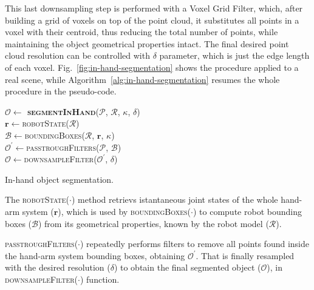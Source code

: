 This last downsampling step is performed with a Voxel Grid Filter, which, after
building a grid of voxels on top of the point cloud, it
substitutes all points in a voxel with their centroid, thus reducing the total number of 
points, while maintaining the object geometrical properties intact. The final desired
point cloud resolution can be controlled with $\delta$ parameter, which is just the edge length of each voxel.
Fig.~\ref{fig:in-hand-segmentation} shows the procedure applied to a real scene,
while  Algorithm~\ref{alg:in-hand-segmentation} resumes  the whole  procedure in
the pseudo-code.

\begin{algorithm}[h]
    \textbf{$\mathcal{O} \leftarrow$ \textsc{segmentInHand}}($\mathcal{P}$, $\mathcal{R}$, $\kappa$, $\delta$)\\ %
\LinesNumbered
\DontPrintSemicolon
\SetAlgoVlined {} 
  $\mathbf{r} \leftarrow$\textsc{robotState}($\mathcal{R}$) \\
  $\mathcal{B} \leftarrow$\textsc{boundingBoxes}($\mathcal{R}$, $\mathbf{r}$, $\kappa$) \\
  $\mathcal{O^\prime} \leftarrow$\textsc{passtroughFilters}($\mathcal{P}$, $\mathcal{B}$) \\
  $\mathcal{O} \leftarrow$\textsc{downsampleFilter}($\mathcal{O^\prime}$, $\delta$) \\
\caption{In-hand object segmentation.} \label{alg:in-hand-segmentation}
\end{algorithm}

The \textsc{robotState}($\cdot$) method retrievs istantaneous joint states
of the whole hand-arm system ($\mathbf{r}$), which is used by \textsc{boundingBoxes($\cdot$)} to compute robot bounding boxes ($\mathcal{B}$)
from its geometrical properties, known by the robot model ($\mathcal{R}$).

\textsc{passtroughFilters}($\cdot$) repeatedly performs filters to remove
all points found inside the hand-arm system bounding boxes, obtaining $\mathcal{O^\prime}$.
That is finally resampled with the desired resolution ($\delta$) 
to obtain the final segmented object ($\mathcal{O}$), in \textsc{downsampleFilter}($\cdot$) function.

